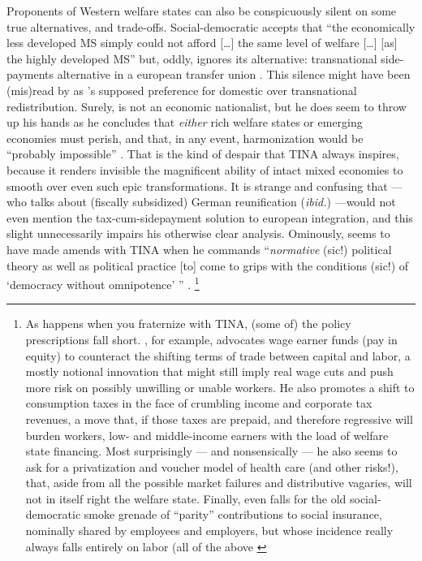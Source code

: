 Proponents of Western welfare states can also be conspicuously silent on some true alternatives, and trade-offs.
Social-democratic \cite{Scharpf1997} accepts that ``the economically less developed \gls{MS} simply could not afford [\ldots] the same level of welfare [\ldots] [as] the highly developed \gls{MS}'' but, oddly, ignores its alternative:
transnational side-payments alternative in a european transfer union \citeyearpar[26]{Scharpf1997}.
This silence might have been (mis)read by \citeauthor{Moravcsik-2002-aa} \citeyearpar[619]{Moravcsik-2002-aa} as \citeauthor{Scharpf1997}'s supposed preference for domestic over transnational redistribution.
Surely, \citeauthor{Scharpf1997} is not an economic nationalist, but he does seem to throw up his hands as he concludes that \emph{either} rich welfare states or emerging economies must perish, and that, in any event, harmonization would be ``probably impossible'' \citeyearpar[26]{Scharpf1997}.
That is the kind of despair that TINA always inspires, because it renders invisible the magnificent ability of intact mixed economies to smooth over even such epic transformations.
It is strange and confusing that \citeauthor{Scharpf1997} --- who talks about (fiscally subsidized) German reunification (\emph{ibid.}) ---would not even mention the tax-cum-sidepayment solution to european integration, and this slight unnecessarily impairs his otherwise clear analysis.
Ominously, \citeauthor{Scharpf1997} seems to have made amends with TINA when he commands ``\emph{normative} (sic!) political theory as well as political practice [to] come to grips with the conditions (sic!) of `democracy without omnipotence' '' \citeyearpar[29]{Scharpf1997}.
\footnote{
	As happens when you fraternize with TINA, (some of) the policy prescriptions fall short.
	\citeauthor{Scharpf1997}, for example, advocates wage earner funds (pay in equity) to counteract the shifting terms of trade between capital and labor, a mostly notional innovation that might still imply real wage cuts and push more risk on possibly unwilling or unable workers.
	He also promotes a shift to consumption taxes in the face of crumbling income and corporate tax revenues, a move that, if those taxes are prepaid, and therefore regressive will burden workers, low- and middle-income earners with the load of welfare state financing.
	Most surprisingly --- and nonsensically --- he also seems to ask for a privatization and voucher model of health care (and other risks!), that, aside from all the possible market failures and distributive vagaries, will not in itself right the welfare state.
	Finally, \citeauthor{Scharpf1997} even falls for the old social-democratic smoke grenade of ``parity'' contributions to social insurance, nominally shared by employees and employers, but whose incidence really always falls entirely on labor (all of the above \citeyear[30-34]{Scharpf1997}
}

